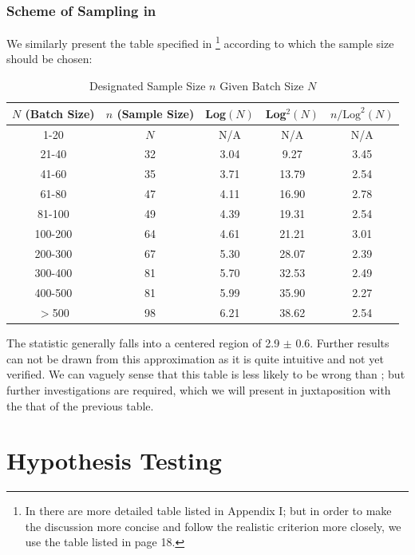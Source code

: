 \documentclass[12pt]{article}
\begin{document}
\subsubsection{Scheme of Sampling in \cite{OIML2016}}

We similarly present the table specified in \cite{OIML2016}\footnote{In \cite{OIML2016} there are more detailed table listed in Appendix I; but in order to make the discussion more concise and follow the realistic criterion more closely, we use the table listed in page 18.} according to which the sample size should be chosen:

\begin{table}[htbp]
    \centering
    \begin{tabular}{ccccc}
        \toprule
        $N$ (Batch Size) & $n$ (Sample Size) & Log$(N)$ & Log$^2(N)$ & $n/\text{Log}^2(N)$ \\
        \midrule
        1-20 & $N$ & N/A & N/A & N/A \\
        21-40   & 32 & 3.04 & 9.27  & 3.45 \\
        41-60   & 35 & 3.71 & 13.79 & 2.54 \\
        61-80   & 47 & 4.11 & 16.90 & 2.78 \\
        81-100  & 49 & 4.39 & 19.31 & 2.54 \\
        100-200 & 64 & 4.61 & 21.21 & 3.01 \\
        200-300 & 67 & 5.30 & 28.07 & 2.39 \\
        300-400 & 81 & 5.70 & 32.53 & 2.49 \\
        400-500 & 81 & 5.99 & 35.90 & 2.27 \\
        $>$500  & 98 & 6.21 & 38.62 & 2.54 \\
        \bottomrule
    \end{tabular}
    \caption{Designated Sample Size $n$ Given Batch Size $N$}
\end{table}

The statistic generally falls into a centered region of 2.9 $\pm$ 0.6. Further results can not be drawn from this approximation as it is quite intuitive and not yet verified. We can vaguely sense that this table is less likely to be wrong than \cite{JJF2005}; but further investigations are required, which we will present in juxtaposition with the that of the previous table. 

\section{Hypothesis Testing}
\end{document}
